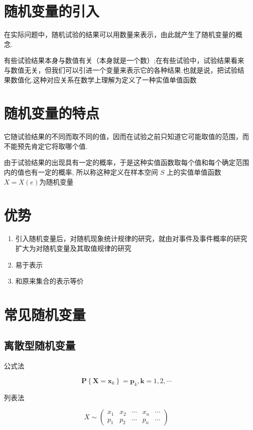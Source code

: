 
\section{随机变量的引入}

在实际问题中，随机试验的结果可以用数量来表示，由此就产生了随机变量的概念.

有些试验结果本身与数值有关（本身就是一个数）;在有些试验中，试验结果看来与数值无关，但我们可以引进一个变量来表示它的各种结果.也就是说，把试验结果数值化.这种对应关系在数学上理解为定义了一种实值单值函数

\section{随机变量的特点}

它随试验结果的不同而取不同的值，因而在试验之前只知道它可能取值的范围，而不能预先肯定它将取哪个值.

由于试验结果的出现具有一定的概率，于是这种实值函数取每个值和每个确定范围内的值也有一定的概率, 所以称这种定义在样本空间 $S$ 上的实值单值函数 $X= X(e)$为随机变量

\section{优势}

\begin{enumerate}
    \item 引入随机变量后，对随机现象统计规律的研究，就由对事件及事件概率的研究扩大为对随机变量及其取值规律的研究
    \item 易于表示
    \item 和原来集合的表示等价
\end{enumerate}

\section{常见随机变量}

\subsection{离散型随机变量}

公式法

$$
\boldsymbol{P}\left\{\boldsymbol{X}=\boldsymbol{x}_{k}\right\}=\boldsymbol{p}_{k}, \boldsymbol{k}=1,2, \cdots
$$

列表法
  
$$X \sim\left(\begin{array}{lllll}x_{1} & x_{2} & \cdots & x_{n} & \cdots \\ p_{1} & p_{2} & \cdots & p_{n} & \cdots\end{array}\right)$$


